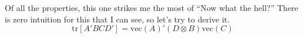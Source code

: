\documentclass[12pt]{article}
\theoremstyle{plain}
\theoremstyle{definition}
\theoremstyle{remark}
\begin{document}
%
%

Of all the properties, this one strikes me the most of
``Now what the hell?''  There is zero intuition for this that
I can see, so let's try to derive it.
\begin{equation}
    \label{vecder}
    \text{tr}\left[A'BCD'\right]
	= \text{vec}(A)' (D \otimes B) \text{vec}(C)
\end{equation}
\end{document}
